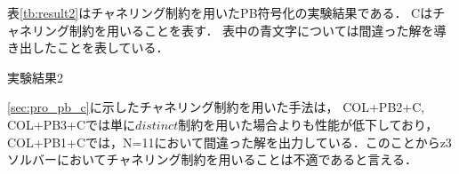 表\ref{tb:result2}はチャネリング制約を用いたPB符号化の実験結果である．
Cはチャネリング制約を用いることを表す．
表中の青文字については間違った解を導き出したことを表している．
\begin{table}[htb]
    \caption{実験結果2}
{\tiny \label{tb:result2}}
\end{table}

\ref{sec:pro_pb_c}に示したチャネリング制約を用いた手法は，
COL+PB2+C, COL+PB3+Cでは単に$distinct$制約を用いた場合よりも性能が低下しており，
COL+PB1+Cでは，N=11において間違った解を出力している．このことからz3ソルバーにおいてチャネリング制約を用いることは不適であると言える．


